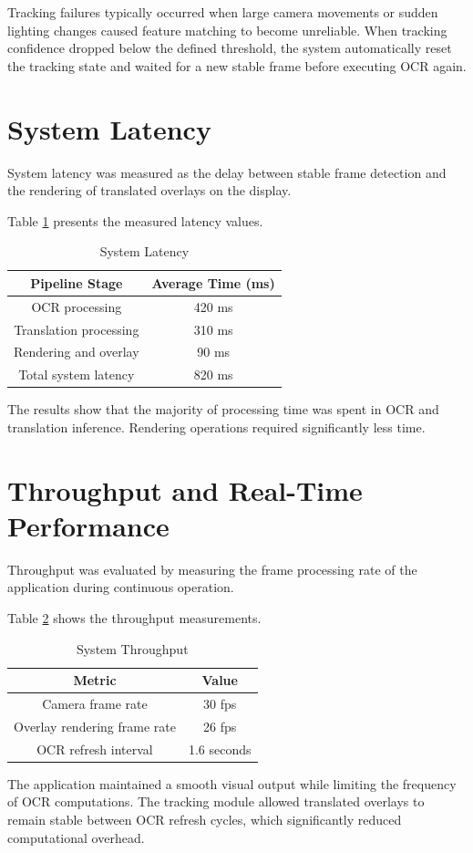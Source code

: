 Tracking failures typically occurred when large camera movements or sudden lighting changes caused feature matching to become unreliable. When tracking confidence dropped below the defined threshold, the system automatically reset the tracking state and waited for a new stable frame before executing OCR again.

\section{System Latency}

System latency was measured as the delay between stable frame detection and the rendering of translated overlays on the display.

Table \ref{tab:latency_results} presents the measured latency values.

\begin{table}[h]
\centering
\caption{System Latency}
\label{tab:latency_results}
\begin{tabular}{|c|c|}
\hline
Pipeline Stage & Average Time (ms) \\
\hline
OCR processing & 420 ms \\
Translation processing & 310 ms \\
Rendering and overlay & 90 ms \\
\hline
Total system latency & 820 ms \\
\hline
\end{tabular}
\end{table}

The results show that the majority of processing time was spent in OCR and translation inference. Rendering operations required significantly less time.

\section{Throughput and Real-Time Performance}

Throughput was evaluated by measuring the frame processing rate of the application during continuous operation.

Table \ref{tab:throughput_results} shows the throughput measurements.

\begin{table}[h]
\centering
\caption{System Throughput}
\label{tab:throughput_results}
\begin{tabular}{|c|c|}
\hline
Metric & Value \\
\hline
Camera frame rate & 30 fps \\
Overlay rendering frame rate & 26 fps \\
OCR refresh interval & 1.6 seconds \\
\hline
\end{tabular}
\end{table}

The application maintained a smooth visual output while limiting the frequency of OCR computations. The tracking module allowed translated overlays to remain stable between OCR refresh cycles, which significantly reduced computational overhead.